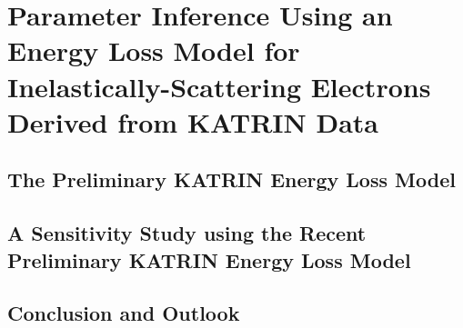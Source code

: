 \chapter{Parameter Inference Using an Energy Loss Model for Inelastically-Scattering Electrons Derived from KATRIN Data}
\label{sec:katrinEloss}

\section{The Preliminary KATRIN Energy Loss Model}




\section{A Sensitivity Study using the Recent Preliminary KATRIN Energy Loss Model}

\section{Conclusion and Outlook}